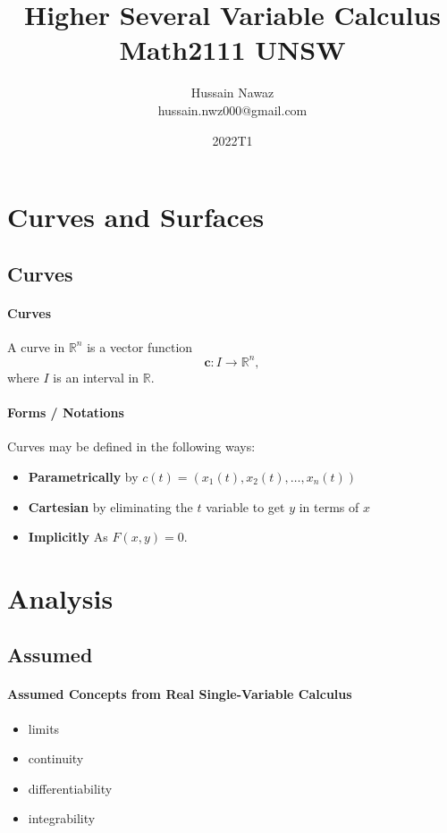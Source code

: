 \documentclass[12pt, letterpaper]{article}
\title{Higher Several Variable Calculus \\ Math2111 UNSW}
\author{Hussain Nawaz \\ hussain.nwz000@gmail.com}
\date{2022T1}
\begin{document}
\maketitle
\tableofcontents
\newpage


    \section{Curves and Surfaces}
    \subsection{Curves}
    \paragraph{Curves}
    A curve in \(\mathbb{R}^n\) is a vector function
    \[\mathbf{c}: I \to\mathbb{R}^n,\]
    where \(I\) is an interval in \(\mathbb{R}\).

    \paragraph{Forms / Notations}
    Curves may be defined in the following ways:
    \begin{itemize}
        \item \textbf{Parametrically} by \(c(t) = \left(x_1(t), x_2(t), \dots, x_n(t)\right)\)
        \item \textbf{Cartesian} by eliminating the \(t\) variable to get \(y\) in terms of \(x\)
        \item \textbf{Implicitly} As \(F(x, y) = 0\).
    \end{itemize}

    \newpage

    \section{Analysis}

    \subsection{Assumed}
    \paragraph{Assumed Concepts from Real Single-Variable Calculus}
    \begin{itemize}
        \item limits
        \item continuity
        \item differentiability
        \item integrability
    \end{itemize}
\end{document}
